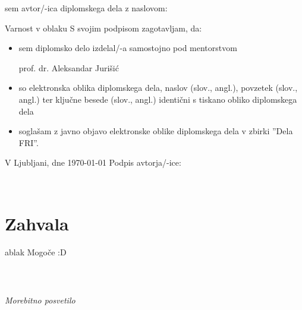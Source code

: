 \documentclass[12pt,a4paper,openany]{book}
\begin{document}
\vspace{1cm}
sem avtor/-ica diplomskega dela z naslovom:

\vspace{0.5cm}
Varnost v oblaku
\vspace{1.5cm}
S svojim podpisom zagotavljam, da:
\begin{itemize}
	\item sem diplomsko delo izdelal/-a samostojno pod mentorstvom

	prof. dr. Aleksandar Jurišić

	\item	so elektronska oblika diplomskega dela, naslov (slov., angl.), povzetek (slov., angl.) ter ključne besede (slov., angl.) identični s tiskano obliko diplomskega dela
	\item soglašam z javno objavo elektronske oblike diplomskega dela v zbirki ''Dela FRI''.
\end{itemize}

\vspace{1cm}
V Ljubljani, dne \today \hspace{1cm} Podpis avtorja/-ice:

\newpage


\ \thispagestyle{empty}

\newpage



\chapter*{Zahvala}

\thispagestyle{empty}
ablak
Mogoče :D


\newpage


\ \thispagestyle{empty}

\newpage


\thispagestyle{empty}

$\;$

\vspace{5cm}
\hfill {\Large \em Morebitno posvetilo}
\thispagestyle{empty}
\end{document}
